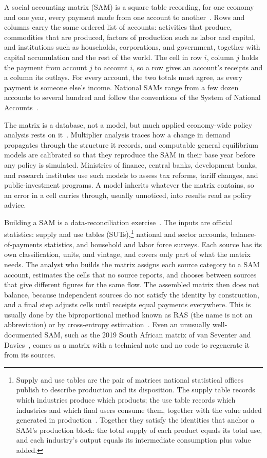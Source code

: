 \documentclass[11pt,a4paper]{article}
\begin{document}
A social accounting matrix (SAM) is a square table recording, for one
economy and one year, every payment made from one account to another~\cite{pyatt1977}. Rows and columns carry the same ordered list of
accounts: activities that produce, commodities that are produced, factors
of production such as labor and capital, and institutions such as
households, corporations, and government, together with capital
accumulation and the rest of the world. The cell in row $i$, column $j$
holds the payment from account $j$ to account $i$, so a row gives an
account's receipts and a column its outlays. For every account, the two
totals must agree, as every payment is someone else's income.
National SAMs range from a few dozen accounts to several hundred and
follow the conventions of the System of National Accounts~\cite{sna2008}.

The matrix is a database, not a model, but much applied economy-wide
policy analysis rests on it~\cite{breisinger2009}. Multiplier analysis
traces how a change in demand propagates through the structure it
records, and computable general equilibrium models are calibrated so that
they reproduce the SAM in their base year before any policy is simulated.
Ministries of finance, central banks, development banks, and research
institutes use such models to assess tax reforms, tariff changes, and
public-investment programs. A model inherits whatever the matrix contains,
so an error in a cell carries through, usually unnoticed, into results
read as policy advice.

Building a SAM is a data-reconciliation exercise~\cite{round2003}. The
inputs are official statistics: supply and use tables
(SUTs),\footnote{Supply and use tables are the pair of matrices national
statistical offices publish to describe production and its disposition.
The supply table records which industries produce which products; the use
table records which industries and which final users consume them,
together with the value added generated in production~\cite{eurostat2008sut}. Together they satisfy the identities that anchor a
SAM's production block: the total supply of each product equals its total
use, and each industry's output equals its intermediate consumption plus
value added.} national and sector accounts, balance-of-payments
statistics, and household and labor force surveys. Each source has its own
classification, units, and vintage, and covers only part of what the
matrix needs. The analyst who builds the matrix assigns each source
category to a SAM account, estimates the cells that no source reports, and
chooses between sources that give different figures for the same flow. The
assembled matrix then does not balance, because independent sources do
not satisfy the identity by construction, and a final step adjusts cells
until receipts equal payments everywhere. This is usually done by the
biproportional method known as RAS (the name is not an abbreviation) or by
cross-entropy estimation~\cite{robinson2001}. Even an unusually well-documented SAM, such as the 2019 South African
matrix of van Seventer and Davies~\cite{vanseventer2023}, comes as a
matrix with a technical note and no code to regenerate it from its
sources.
\end{document}
